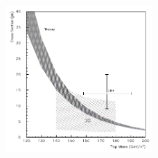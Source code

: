 \begin{figure}
  \centering
  \includegraphics[width=0.5\textwidth]{figures/result.pdf}
\end{figure}

\nocite{*}
\printbibliography


